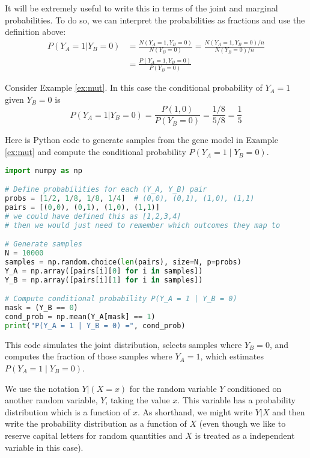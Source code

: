  
 It will be extremely useful to write this in terms of the joint and marginal probabilities. To do so, we can interpret the probabilities as fractions and use the definition above:  
\begin{align*}
P(Y_A=1|Y_B=0) &= \frac{N(Y_A = 1,Y_B= 0)}{N(Y_B=0)} = \frac{N(Y_A = 1,Y_B = 0)/n}{N(Y_B=0)/n} \\
&= \frac{P(Y_A = 1,Y_B = 0)}{P(Y_B = 0)}
\end{align*}


\begin{example}
Consider Example \ref{ex:mut}. In this case the conditional probability of $Y_A = 1$ given $Y_B=0$ is 
\begin{equation*}
P(Y_A = 1|Y_B = 0) = \frac{P(1,0)}{P(Y_B = 0)} = \frac{1/8}{5/8} = \frac{1}{5} 
\end{equation*}

\end{example}


\begin{example}
Here is Python code to generate samples from the gene model in Example \ref{ex:mut} and compute the conditional probability $P(Y_A = 1 \mid Y_B = 0)$.

\begin{lstlisting}[language=Python]
import numpy as np

# Define probabilities for each (Y_A, Y_B) pair
probs = [1/2, 1/8, 1/8, 1/4]  # (0,0), (0,1), (1,0), (1,1)
pairs = [(0,0), (0,1), (1,0), (1,1)]
# we could have defined this as [1,2,3,4] 
# then we would just need to remember which outcomes they map to

# Generate samples
N = 10000
samples = np.random.choice(len(pairs), size=N, p=probs)
Y_A = np.array([pairs[i][0] for i in samples])
Y_B = np.array([pairs[i][1] for i in samples])

# Compute conditional probability P(Y_A = 1 | Y_B = 0)
mask = (Y_B == 0)
cond_prob = np.mean(Y_A[mask] == 1)
print("P(Y_A = 1 | Y_B = 0) =", cond_prob)
\end{lstlisting}

This code simulates the joint distribution, selects samples where $Y_B = 0$, and computes the fraction of those samples where $Y_A = 1$, which estimates $P(Y_A = 1 \mid Y_B = 0)$.
\end{example}




We use the notation $Y|(X=x)$ for the random variable $Y$ conditioned on another random variable, $Y$, taking the value $x$. This variable has a probability distribution which is a function of $x$. As shorthand, we might write $Y|X$ and then write the probability distribution as a function of $X$ (even though we like to reserve capital letters for random quantities and $X$ is treated as a independent variable in this case). 


